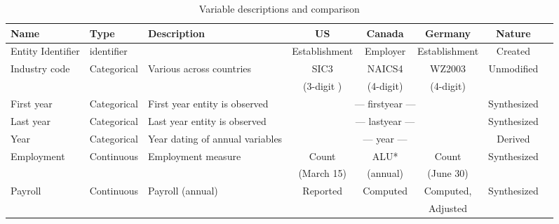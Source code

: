 \begin{table}[H]
  \centering\footnotesize
  \caption{Variable descriptions and comparison}  \label{tab:common_Variable} \medskip
  \renewcommand{\arraystretch}{1}
 \setlength{\tabcolsep}{4.5pt}
 \begin{tabular}{l  l l c c c c c}
    \toprule
    \textbf{Name}&\textbf{Type} &\textbf{Description} &\textbf{US} & \textbf{Canada} &\textbf{Germany} &\textbf{Nature}\\
    \midrule
Entity Identifier& identifier& & Establishment & Employer & Establishment &Created\\
\midrule
Industry code&Categorical& Various across countries &SIC3 & NAICS4 & WZ2003 &Unmodified\\
             &           &                          &(3-digit )& (4-digit) &(4-digit)  &\\
\midrule
First year&Categorical&First year entity is observed &\multicolumn{3}{c}{--- firstyear ---}&Synthesized\\
Last year&Categorical&Last year entity is observed &\multicolumn{3}{c}{--- lastyear ---}&Synthesized\\
Year&Categorical&Year dating of annual variables&\multicolumn{3}{c}{--- year ---}&Derived\\
\midrule
Employment & Continuous & Employment measure & Count & ALU* & Count & Synthesized \\
            &            &                    & (March 15) &(annual)& (June 30)&\\
Payroll&Continuous&  Payroll (annual)& Reported & Computed & Computed,  &Synthesized\\
       &          &                  &          &          & Adjusted\\
   \bottomrule
  \end{tabular} 
\end{table}